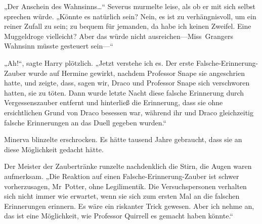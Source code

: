 „Der Anschein des Wahnsinns…“ Severus murmelte leise, als ob er mit sich selbst sprechen würde. „Könnte es natürlich sein? Nein, es ist zu verhängnisvoll, um ein reiner Zufall zu sein; zu bequem für jemanden, da habe ich keinen Zweifel. Eine Muggeldroge vielleicht? Aber das würde nicht ausreichen—Miss~Grangers Wahnsinn müsste gesteuert sein—“

„Ah!“, sagte Harry plötzlich. „Jetzt verstehe ich es. Der erste Falsche-Erinnerung-Zauber wurde auf Hermine gewirkt, nachdem Professor Snape sie angeschrien hatte, und zeigte, dass, sagen wir, Draco und Professor Snape sich verschworen hatten, sie zu töten. Dann wurde letzte Nacht diese falsche Erinnerung durch Vergessenszauber entfernt und hinterließ die Erinnerung, dass sie ohne ersichtlichen Grund von Draco besessen war, während ihr und Draco gleichzeitig falsche Erinnerungen an das Duell gegeben wurden.“

Minerva blinzelte erschrocken. Es hätte tausend Jahre gebraucht, dass sie an diese Möglichkeit gedacht hätte.

Der Meister der Zaubertränke runzelte nachdenklich die Stirn, die Augen waren aufmerksam. „Die Reaktion auf einen Falsche-Erinnerung-Zauber ist schwer vorherzusagen, Mr~Potter, ohne Legilimentik. Die Versuchspersonen verhalten sich nicht immer wie erwartet, wenn sie sich zum ersten Mal an die falschen Erinnerungen erinnern. Es wäre ein riskanter Trick gewesen. Aber ich nehme an, das ist eine Möglichkeit, wie Professor Quirrell es gemacht haben könnte.“

